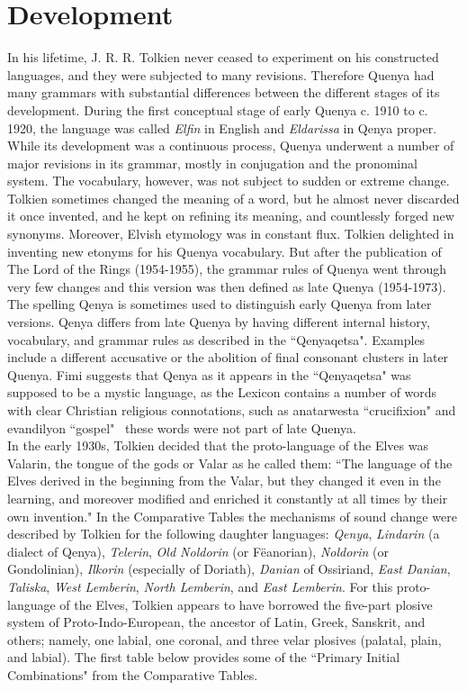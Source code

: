 \documentclass[pub]{apa6}
\begin{document}
\section{Development}
In his lifetime, J. R. R. Tolkien never ceased to experiment on his constructed languages, and they were subjected to many revisions. Therefore Quenya had many grammars with substantial differences between the different stages of its development. During the first conceptual stage of early Quenya c. 1910 to c. 1920, the language was called {\it Elfin} in English and {\it Eldarissa} in Qenya proper. While its development was a continuous process, Quenya underwent a number of major revisions in its grammar, mostly in conjugation and the pronominal system. The vocabulary, however, was not subject to sudden or extreme change. Tolkien sometimes changed the meaning of a word, but he almost never discarded it once invented, and he kept on refining its meaning, and countlessly forged new synonyms. Moreover, Elvish etymology was in constant flux. Tolkien delighted in inventing new etonyms for his Quenya vocabulary. But after the publication of The Lord of the Rings (1954-1955), the grammar rules of Quenya went through very few changes and this version was then defined as late Quenya (1954-1973).\\
\indent The spelling Qenya is sometimes used to distinguish early Quenya from later versions. Qenya differs from late Quenya by having different internal history, vocabulary, and grammar rules as described in the ``Qenyaqetsa". Examples include a different accusative or the abolition of final consonant clusters in later Quenya. Fimi suggests that Qenya as it appears in the ``Qenyaqetsa" was supposed to be a mystic language, as the Lexicon contains a number of words with clear Christian religious connotations, such as anatarwesta ``crucifixion" and evandilyon ``gospel" \textendash\  these words were not part of late Quenya.\\
\indent In the early 1930s, Tolkien decided that the proto-language of the Elves was Valarin, the tongue of the gods or Valar as he called them: ``The language of the Elves derived in the beginning from the Valar, but they changed it even in the learning, and moreover modified and enriched it constantly at all times by their own invention." In the Comparative Tables the mechanisms of sound change were described by Tolkien for the following daughter languages: {\it Qenya}, {\it Lindarin} (a dialect of Qenya), {\it Telerin}, {\it Old Noldorin} (or Fëanorian), {\it Noldorin} (or Gondolinian), {\it Ilkorin} (especially of Doriath), {\it Danian} of Ossiriand, {\it East Danian}, {\it Taliska}, {\it West Lemberin}, {\it North Lemberin}, and {\it East Lemberin}. For this proto-language of the Elves, Tolkien appears to have borrowed the five-part plosive system of Proto-Indo-European, the ancestor of Latin, Greek, Sanskrit, and others; namely, one labial, one coronal, and three velar plosives (palatal, plain, and labial). The first table below provides some of the ``Primary Initial Combinations" from the Comparative Tables.\\
\end{document}
